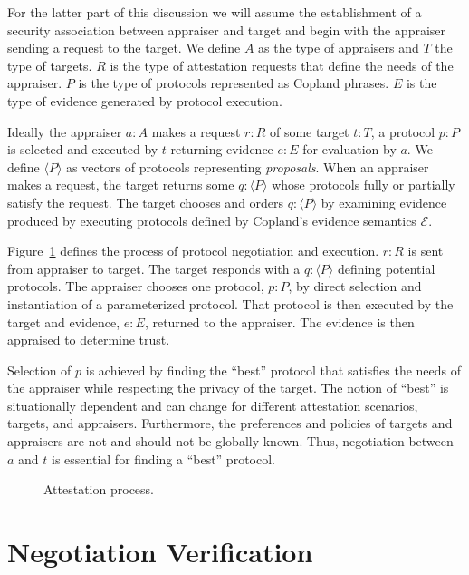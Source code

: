 \documentclass[sigconf,authordraft]{acmart}
\begin{document}

For the latter part of this discussion we will assume the
establishment of a security association between appraiser and target
and begin with the appraiser sending a request to the target.  We
define $A$ as the type of appraisers and $T$ the type of targets.  $R$
is the type of attestation requests that define the needs of the
appraiser.  $P$ is the type of protocols represented as Copland
phrases.  $E$ is the type of evidence generated by protocol execution.

Ideally the appraiser $a:A$ makes a request $r:R$ of some target
$t:T$, a protocol $p:P$ is selected and executed by $t$ returning
evidence $e:E$ for evaluation by $a$. We define $\langle P \rangle$ as
vectors of protocols representing \emph{proposals}.  When an appraiser
makes a request, the target returns some $q:\langle P \rangle$ whose
protocols fully or partially satisfy the request. The target chooses
and orders $q:\langle P\rangle$ by examining evidence produced by
executing protocols defined by Copland's evidence semantics
$\mathcal{E}$.

Figure~\ref{fig:sequence-fig} defines the process of protocol
negotiation and execution.  $r:R$ is sent from appraiser to target.
The target responds with a $q:\langle P\rangle$ defining potential
protocols.  The appraiser chooses one protocol, $p:P$, by direct
selection and instantiation of a parameterized protocol.  That
protocol is then executed by the target and evidence, $e:E$, returned
to the appraiser.  The evidence is then appraised to determine trust.

Selection of $p$ is achieved by finding the ``best'' protocol that
satisfies the needs of the appraiser while respecting the privacy of
the target. The notion of ``best'' is situationally dependent and can
change for different attestation scenarios, targets, and appraisers.
Furthermore, the preferences and policies of targets and appraisers
are not and should not be globally known.  Thus, negotiation between
$a$ and $t$ is essential for finding a ``best'' protocol.

\begin{figure}[hbtp]
  \centering 
  \caption[Attestation process]{Attestation process.}
  \label{fig:sequence-fig}
\end{figure}

\section{Negotiation Verification}
\end{document}
